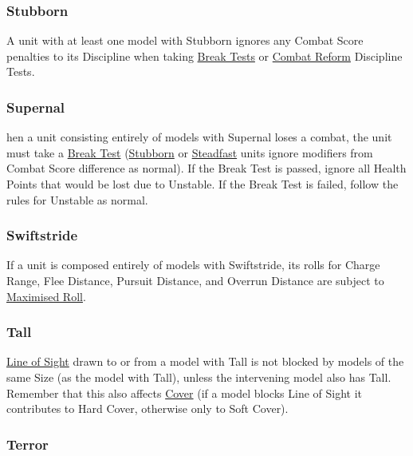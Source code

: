 \subsubsection{Stubborn}
\label{stubborn}

A unit with at least one model with Stubborn ignores any Combat Score penalties to its Discipline when taking \hyperref[break_test]{Break Tests} or \hyperref[combat_reform]{Combat Reform} Discipline Tests.

\subsubsection{Supernal}
\label{supernal}

hen a unit consisting entirely of models with Supernal loses a combat, the unit must take a \hyperref[break_test]{Break Test} (\hyperref[stubborn]{Stubborn} or \hyperref[steadfast]{Steadfast} units ignore modifiers from Combat Score difference as normal). If the Break Test is passed, ignore all Health Points that would be lost due to Unstable. If the Break Test is failed, follow the rules for Unstable as normal.

\subsubsection{Swiftstride}
\label{swiftstride}

If a unit is composed entirely of models with Swiftstride, its rolls for Charge Range, Flee Distance, Pursuit Distance, and Overrun Distance are subject to \hyperref[maximised_roll]{Maximised Roll}.

\subsubsection{Tall}
\label{tall}

\hyperref[line_of_sight]{Line of Sight} drawn to or from a model with Tall is not blocked by models of the same Size (as the model with Tall), unless the intervening model also has Tall. Remember that this also affects \hyperref[cover]{Cover} (if a model blocks Line of Sight it contributes to Hard Cover, otherwise only to Soft Cover).

\subsubsection{Terror}
\label{terror}

